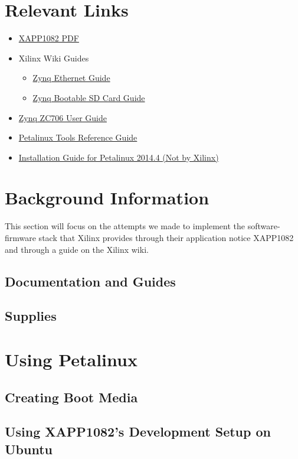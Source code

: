 \documentclass[12pt]{report}
\begin{document}
\section{Relevant Links}
\begin{itemize}
  \item \href{http://www.xilinx.com/support/documentation/application_notes/xapp1082-zynq-eth.pdf}{XAPP1082 PDF}
  \item Xilinx Wiki Guides
    \begin{itemize}
    \item \href{http://www.wiki.xilinx.com/Zynq+PL+Ethernet}{Zynq Ethernet Guide}
    \item \href{http://www.wiki.xilinx.com/Prepare+Boot+Medium}{Zynq Bootable SD Card Guide}
    \end{itemize}
  \item \href{http://www.xilinx.com/support/documentation/boards_and_kits/zc706/ug954-zc706-eval-board-xc7z045-ap-soc.pdf}{Zynq ZC706 User Guide}
  \item \href{http://www.xilinx.com/support/documentation/sw_manuals/petalinux2014_4/ug1144-petalinux-tools-reference-guide.pdf}{Petalinux Tools Reference Guide}
  \item \href{http://www.syfer.com.au/assets/s502-00000-a.pdf}{Installation Guide for Petalinux 2014.4 (Not by Xilinx)}
\end{itemize}
\section{Background Information}
This section will focus on the attempts we made to implement the software-firmware stack that Xilinx provides through their application notice XAPP1082 and through a guide on the Xilinx wiki.
\subsection{Documentation and Guides}
\subsection{Supplies}
\section{Using Petalinux}
\subsection{Creating Boot Media}
\subsection{Using XAPP1082's Development Setup on Ubuntu}
\end{document}
